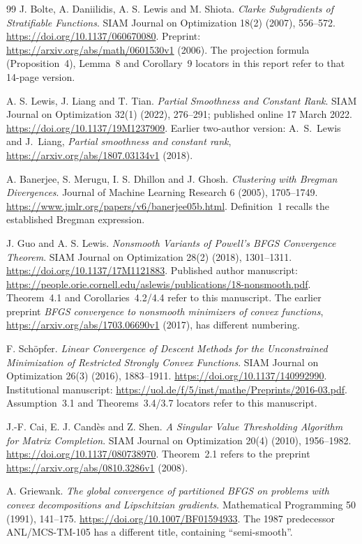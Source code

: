 \begin{thebibliography}{99}
J. Bolte, A. Daniilidis, A. S. Lewis and M. Shiota. \emph{Clarke Subgradients of Stratifiable Functions}. SIAM Journal on Optimization 18(2) (2007), 556--572. \url{https://doi.org/10.1137/060670080}. Preprint: \url{https://arxiv.org/abs/math/0601530v1} (2006). The projection formula (Proposition~4), Lemma~8 and Corollary~9 locators in this report refer to that 14-page version.

A. S. Lewis, J. Liang and T. Tian. \emph{Partial Smoothness and Constant Rank}. SIAM Journal on Optimization 32(1) (2022), 276--291; published online 17 March 2022. \url{https://doi.org/10.1137/19M1237909}. Earlier two-author version: A.~S.~Lewis and J.~Liang, \emph{Partial smoothness and constant rank}, \url{https://arxiv.org/abs/1807.03134v1} (2018).

A. Banerjee, S. Merugu, I. S. Dhillon and J. Ghosh. \emph{Clustering with Bregman Divergences}. Journal of Machine Learning Research 6 (2005), 1705--1749. \url{https://www.jmlr.org/papers/v6/banerjee05b.html}. Definition~1 recalls the established Bregman expression.

J. Guo and A. S. Lewis. \emph{Nonsmooth Variants of Powell's BFGS Convergence Theorem}. SIAM Journal on Optimization 28(2) (2018), 1301--1311. \url{https://doi.org/10.1137/17M1121883}. Published author manuscript: \url{https://people.orie.cornell.edu/aslewis/publications/18-nonsmooth.pdf}. Theorem~4.1 and Corollaries~4.2/4.4 refer to this manuscript. The earlier preprint \emph{BFGS convergence to nonsmooth minimizers of convex functions}, \url{https://arxiv.org/abs/1703.06690v1} (2017), has different numbering.

F. Sch\"opfer. \emph{Linear Convergence of Descent Methods for the Unconstrained Minimization of Restricted Strongly Convex Functions}. SIAM Journal on Optimization 26(3) (2016), 1883--1911. \url{https://doi.org/10.1137/140992990}. Institutional manuscript: \url{https://uol.de/f/5/inst/mathe/Preprints/2016-03.pdf}. Assumption~3.1 and Theorems~3.4/3.7 locators refer to this manuscript.

J.-F. Cai, E. J. Cand\`es and Z. Shen. \emph{A Singular Value Thresholding Algorithm for Matrix Completion}. SIAM Journal on Optimization 20(4) (2010), 1956--1982. \url{https://doi.org/10.1137/080738970}. Theorem~2.1 refers to the preprint \url{https://arxiv.org/abs/0810.3286v1} (2008).

A. Griewank. \emph{The global convergence of partitioned BFGS on problems with convex decompositions and Lipschitzian gradients}. Mathematical Programming 50 (1991), 141--175. \url{https://doi.org/10.1007/BF01594933}. The 1987 predecessor ANL/MCS-TM-105 has a different title, containing ``semi-smooth''.


\end{thebibliography}
